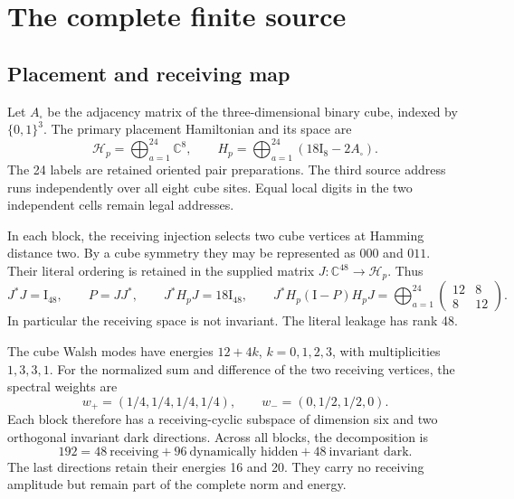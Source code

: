\documentclass[11pt]{article}
\theoremstyle{definition}
\newcommand{\HH}{\mathcal H}
\newcommand{\Id}{\mathrm I}
\begin{document}
\section{The complete finite source}\label{sec:source}

\subsection{Placement and receiving map}

Let $A_\square$ be the adjacency matrix of the three-dimensional binary cube, indexed by $\{0,1\}^3$. The primary placement Hamiltonian and its space are
\begin{equation}\label{eq:H192}
 \HH_p=\bigoplus_{a=1}^{24}\mathbb C^8,\qquad
 H_p=\bigoplus_{a=1}^{24}(18\Id_8-2A_\square).
\end{equation}
The 24 labels are retained oriented pair preparations. The third source address runs independently over all eight cube sites. Equal local digits in the two independent cells remain legal addresses.

In each block, the receiving injection selects two cube vertices at Hamming distance two. By a cube symmetry they may be represented as $000$ and $011$. Their literal ordering is retained in the supplied matrix $J:\mathbb C^{48}\to\HH_p$. Thus
\begin{equation}\label{eq:compression}
 J^*J=\Id_{48},\qquad P=JJ^*,\qquad
 J^*H_pJ=18\Id_{48},\qquad
 J^*H_p(\Id-P)H_pJ=
 \bigoplus_{a=1}^{24}\begin{pmatrix}12&8\\8&12\end{pmatrix}.
\end{equation}
In particular the receiving space is not invariant. The literal leakage has rank 48.

The cube Walsh modes have energies $12+4k$, $k=0,1,2,3$, with multiplicities $1,3,3,1$. For the normalized sum and difference of the two receiving vertices, the spectral weights are
\begin{equation}\label{eq:weights}
 w_+=(1/4,1/4,1/4,1/4),\qquad
 w_-=(0,1/2,1/2,0).
\end{equation}
Each block therefore has a receiving-cyclic subspace of dimension six and two orthogonal invariant dark directions. Across all blocks, the decomposition is
\begin{equation}\label{eq:dimensions}
 192=48\ \text{receiving}+96\ \text{dynamically hidden}
       +48\ \text{invariant dark}.
\end{equation}
The last directions retain their energies 16 and 20. They carry no receiving amplitude but remain part of the complete norm and energy.
\end{document}
